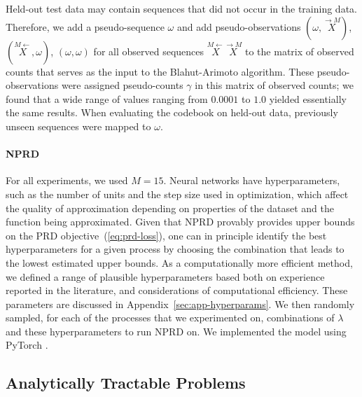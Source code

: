 \documentclass[entropy,article,submit,moreauthors,pdftex,10pt,a4paper]{Definitions/mdpi}
\newcommand{\finitefuture}{\stackrel{\rightarrow \scriptscriptstyle{M}}{X}}
\newcommand{\finitepast}{\stackrel{\scriptscriptstyle{M}\leftarrow}{X}}%
\begin{document}
Held-out test data may contain sequences that did not occur in the training data. Therefore, we add a pseudo-sequence $\omega$ and add pseudo-observations $(\omega, \finitefuture)$, $(\finitepast, \omega)$, $(\omega, \omega)$ for all observed sequences $\finitepast\finitefuture$ to the matrix of observed counts that serves as the input to the Blahut-Arimoto algorithm.
These pseudo-observations were assigned pseudo-counts $\gamma$ in this matrix of observed counts; we found that a wide range of values ranging from $0.0001$ to $1.0$ yielded essentially the same results.
When evaluating the codebook on held-out data, previously unseen sequences were mapped to $\omega$.


\paragraph{NPRD}
For all experiments, we used $M=15$.
Neural networks have hyperparameters, such as the number of units and the step size used in optimization, which affect the quality of approximation depending on properties of the dataset and the function being approximated.
Given that NPRD provably provides upper bounds on the PRD objective~(\ref{eq:prd-loss}), one can in principle identify the best hyperparameters for a given process by choosing the combination that leads to the lowest estimated upper bounds.
As a computationally more efficient method, we defined a range of plausible hyperparameters based both on experience reported in the literature, and considerations of computational efficiency.
These parameters are discussed in Appendix~\ref{sec:app-hyperparams}.
We then randomly sampled, for each of the processes that we experimented on, combinations of $\lambda$ and these hyperparameters to run NPRD on.
We implemented the model using PyTorch \citep{paszke2017automatic}.

\subsection{Analytically Tractable Problems}\label{sec:tractable}
\end{document}
